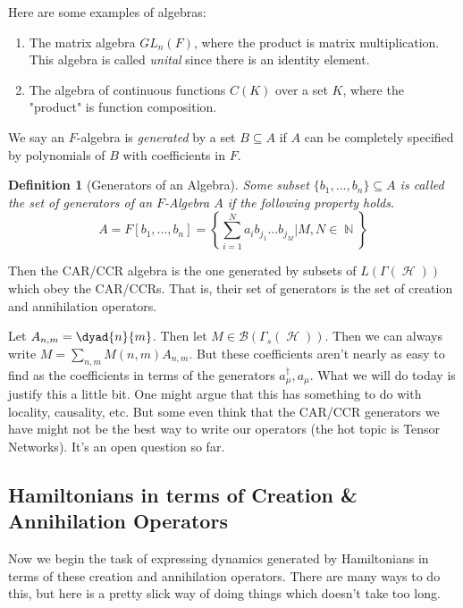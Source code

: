 \documentclass{article}
\DeclareMathOperator{\Hh}{{\mathcal{H}}}
\DeclareMathOperator{\NN}{\mathbb{N}}
\newtheorem{defn}{Definition}
\begin{document}
Here are some examples of algebras:
\begin{enumerate}
\item The matrix algebra $GL_n(F)$, where the product is matrix multiplication. This algebra is called \textit{unital} since there is an identity element.
\item The algebra of continuous functions $C(K)$ over a set $K$, where the "product" is function composition.
\end{enumerate}

We say an $F$-algebra is \textit{generated} by a set $B \subseteq A$ if $A$ can be completely specified by polynomials of $B$ with coefficients in $F$.

\begin{defn}[Generators of an Algebra] Some subset $\{b_1,...,b_n\}\subseteq A$ is called the set of generators of an $F$-Algebra $A$ if the following property holds.
\begin{equation}
A = F[b_1,...,b_n] = \left\{\sum_{i=1}^N a_i b_{j_1}...b_{j_M} | M, N \in \NN\right\}
\end{equation}
\end{defn}

Then the CAR/CCR algebra is the one generated by subsets of $L(\Gamma(\Hh))$ which obey the CAR/CCRs. That is, their set of generators is the set of creation and annihilation operators.

Let $A_{n,m} = \dyad{n}{m}$. Then let $M \in \mathcal{B}(\Gamma_s(\Hh))$. Then we can always write $M = \sum_{n,m} M(n,m) A_{n,m}$. But these coefficients aren't nearly as easy to find as the coefficients in terms of the generators $a_\mu^\dagger, a_\mu$. What we will do today is justify this a little bit. One might argue that this has something to do with locality, causality, etc. But some even think that the CAR/CCR generators we have might not be the best way to write our operators (the hot topic is Tensor Networks). It's an open question so far.

\subsection{Hamiltonians in terms of Creation \& Annihilation Operators}
Now we begin the task of expressing dynamics generated by Hamiltonians in terms of these creation and annihilation operators. There are many ways to do this, but here is a pretty slick way of doing things which doesn't take too long.
\end{document}
